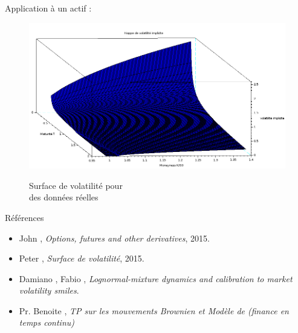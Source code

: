 \documentclass[final]{beamer}
\newlength{\onecolwid}
\begin{document}
\begin{frame}[t]
\begin{columns}[t]
\begin{column}{\onecolwid}
\begin{block}{Application à un actif :}
  \begin{minipage}{1.49\textwidth}
    \begin{figure}
      \vspace{-8.5cm}
      \includegraphics[scale=0.55]{volimpl2.png}
      \label{volimpl2}
      \caption{Surface de volatilité pour \\ des données réelles}
    \end{figure}
  \end{minipage}
\end{block}


\vspace{-1cm}
\begin{block}{Références}

  \begin{minipage}{0.8\textwidth}
    \begin{itemize}
      \small
        \item John ,  \textit{Options, futures and other derivatives}, 2015.
        \item Peter , \textit{Surface de volatilité}, 2015.
        \item Damiano , Fabio , \textit{Lognormal-mixture dynamics and calibration to market volatility smiles}.
        \item Pr. Benoite , \textit{TP sur les mouvements Brownien et Modèle de  (finance en temps continu)}
    \end{itemize}
    \end{minipage}


\end{block}
\end{column}
\end{columns}
\end{frame}
\end{document}
